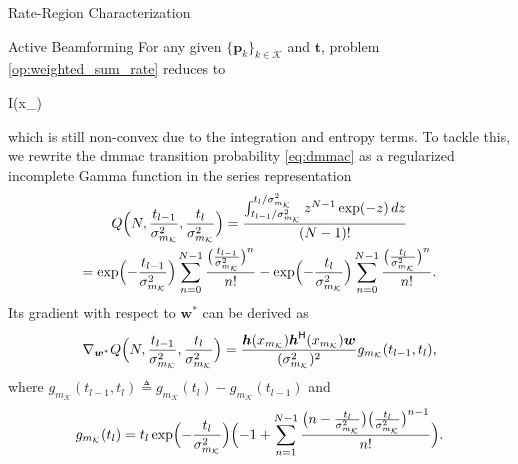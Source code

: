 \documentclass[journal]{IEEEtran}
\begin{document}
\begin{section}{Rate-Region Characterization}
	\begin{subsection}{Active Beamforming}
		For any given $\{\boldsymbol{p}_k\}_{k \in \mathcal{K}}$ and $\boldsymbol{t}$, problem \eqref{op:weighted_sum_rate} reduces to
		\begin{maxi!}
			{}{I(x_{})}{\label{op:active_beamforming}}{\label{ob:active_beamforming}}
			\addConstraint{\eqref{co:transmit_power},}
		\end{maxi!}
		which is still non-convex due to the integration and entropy terms.
		To tackle this, we rewrite the \gls{dmmac} transition probability \eqref{eq:dmmac} as a regularized incomplete Gamma function in the series representation \cite[Theorem 3]{Jameson2016}
		\begin{equation}
			\begin{gathered}
				Q\Bigl(N,\frac{t_{l-1}}{\sigma_{m_{\mathcal{K}}}^2},\frac{t_l}{\sigma_{m_{\mathcal{K}}}^2}\Bigr) = \frac{\int_{{t_{l-1}}/{\sigma_{m_{\mathcal{K}}}^2}}^{{t_l}/{\sigma_{m_{\mathcal{K}}}^2}} z^{N-1} \exp(-z) \, d z}{(N-1)!}\\
				= \exp \Bigl(-\frac{t_{l-1}}{\sigma_{m_{\mathcal{K}}}^2}\Bigr) \sum_{n=0}^{N-1} \frac{\bigl(\frac{t_{l-1}}{\sigma_{m_{\mathcal{K}}}^2}\bigr)^n}{n!} - \exp \Bigl(-\frac{t_l}{\sigma_{m_{\mathcal{K}}}^2}\Bigr) \sum_{n=0}^{N-1} \frac{\bigl(\frac{t_l}{\sigma_{m_{\mathcal{K}}}^2}\bigr)^n}{n!}.
			\end{gathered}
			\label{eq:regularized_incomplete_gamma}
		\end{equation}
		Its gradient with respect to $\boldsymbol{w}^*$ can be derived as
		\begin{equation}
			\nabla_{\boldsymbol{w}^*} Q\Bigl(N,\frac{t_{l-1}}{\sigma_{m_{\mathcal{K}}}^2},\frac{t_l}{\sigma_{m_{\mathcal{K}}}^2}\Bigr) = \frac{\boldsymbol{h}(x_{m_{\mathcal{K}}})\boldsymbol{h}^\mathsf{H}(x_{m_{\mathcal{K}}})\boldsymbol{w}}{(\sigma_{m_{\mathcal{K}}}^2)^2} g_{m_{\mathcal{K}}}(t_{l-1},t_l),
			\label{eq:regularized_incomplete_gamma_gradient}
		\end{equation}
		where $g_{m_{\mathcal{K}}}(t_{l-1},t_l) \triangleq g_{m_{\mathcal{K}}}(t_l)-g_{m_{\mathcal{K}}}(t_{l-1})$ and
		\begin{equation}
			g_{m_{\mathcal{K}}}(t_l) = t_l\exp\Bigl(-\frac{t_l}{\sigma_{m_{\mathcal{K}}}^2}\Bigr)\Bigl(-1+\sum_{n=1}^{N-1} \frac{\bigl(n - \frac{t_l}{\sigma_{m_{\mathcal{K}}}^2}\bigr) \bigl(\frac{t_l}{\sigma_{m_{\mathcal{K}}}^2}\bigr)^{n-1}}{n!}\Bigr).
			\label{eq:regularized_incomplete_gamma_gradient_component}
		\end{equation}

\end{subsection}
\end{section}
\end{document}
